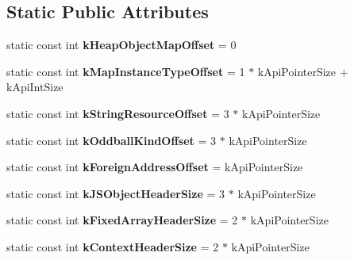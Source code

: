 \subsection*{Static Public Attributes}
\begin{DoxyCompactItemize}
\item 
\hypertarget{classv8_1_1internal_1_1Internals_a0902a596b5656b4592157eaacc020512}{static const int {\bfseries k\-Heap\-Object\-Map\-Offset} = 0}\label{classv8_1_1internal_1_1Internals_a0902a596b5656b4592157eaacc020512}

\item 
\hypertarget{classv8_1_1internal_1_1Internals_a39ea290dfaa9de300bd79aa73a874a88}{static const int {\bfseries k\-Map\-Instance\-Type\-Offset} = 1 $\ast$ k\-Api\-Pointer\-Size + k\-Api\-Int\-Size}\label{classv8_1_1internal_1_1Internals_a39ea290dfaa9de300bd79aa73a874a88}

\item 
\hypertarget{classv8_1_1internal_1_1Internals_a8c2b35069864f567ca0c571310dd90a1}{static const int {\bfseries k\-String\-Resource\-Offset} = 3 $\ast$ k\-Api\-Pointer\-Size}\label{classv8_1_1internal_1_1Internals_a8c2b35069864f567ca0c571310dd90a1}

\item 
\hypertarget{classv8_1_1internal_1_1Internals_a98685d6861a07139720cd296f94f2b73}{static const int {\bfseries k\-Oddball\-Kind\-Offset} = 3 $\ast$ k\-Api\-Pointer\-Size}\label{classv8_1_1internal_1_1Internals_a98685d6861a07139720cd296f94f2b73}

\item 
\hypertarget{classv8_1_1internal_1_1Internals_ad4134449ee39b95e5ac035996aa7d66b}{static const int {\bfseries k\-Foreign\-Address\-Offset} = k\-Api\-Pointer\-Size}\label{classv8_1_1internal_1_1Internals_ad4134449ee39b95e5ac035996aa7d66b}

\item 
\hypertarget{classv8_1_1internal_1_1Internals_af8faf3ff3271d26bafa6ca0ea87e2a57}{static const int {\bfseries k\-J\-S\-Object\-Header\-Size} = 3 $\ast$ k\-Api\-Pointer\-Size}\label{classv8_1_1internal_1_1Internals_af8faf3ff3271d26bafa6ca0ea87e2a57}

\item 
\hypertarget{classv8_1_1internal_1_1Internals_a715ca62a5ddceac28d43c470db067675}{static const int {\bfseries k\-Fixed\-Array\-Header\-Size} = 2 $\ast$ k\-Api\-Pointer\-Size}\label{classv8_1_1internal_1_1Internals_a715ca62a5ddceac28d43c470db067675}

\item 
\hypertarget{classv8_1_1internal_1_1Internals_aa5187d7653158ef851c53594e6e63851}{static const int {\bfseries k\-Context\-Header\-Size} = 2 $\ast$ k\-Api\-Pointer\-Size}\label{classv8_1_1internal_1_1Internals_aa5187d7653158ef851c53594e6e63851}


\end{DoxyCompactItemize}
